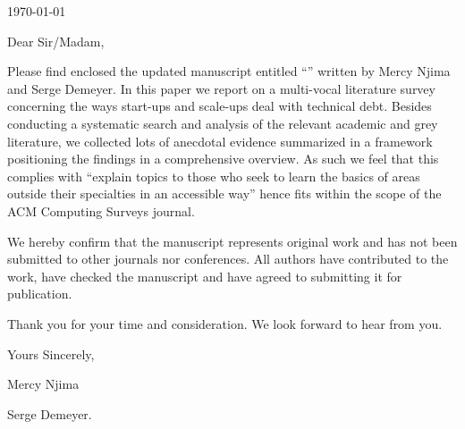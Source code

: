 
\begin{flushright}
\today
\end{flushright}

\vspace{1em}
\noindent
Dear Sir/Madam,

\vspace{1em}

Please find enclosed the updated manuscript entitled ``\paperTitle'' written by Mercy Njima and Serge Demeyer.
In this paper we report on a multi-vocal literature survey concerning the ways start-ups and scale-ups deal with technical debt.
Besides conducting a systematic search and analysis of the relevant academic and grey literature, we collected lots of anecdotal evidence summarized in a framework positioning the findings in a comprehensive overview.
As such we feel that this complies with ``explain topics to those who seek to learn the basics of areas outside their specialties in an accessible way'' hence fits within the scope of the ACM Computing Surveys journal.

We hereby confirm that the manuscript represents original work and has not been submitted to other journals nor conferences.
All authors have contributed to the work, have checked the manuscript and have agreed to submitting it for publication.


\vspace{1em}
\noindent
Thank you for your time and consideration.
We look forward to hear from you.


\vspace{2em}
\noindent
Yours Sincerely,

\vspace{1em}

\noindent
Mercy Njima

\noindent
Serge Demeyer.